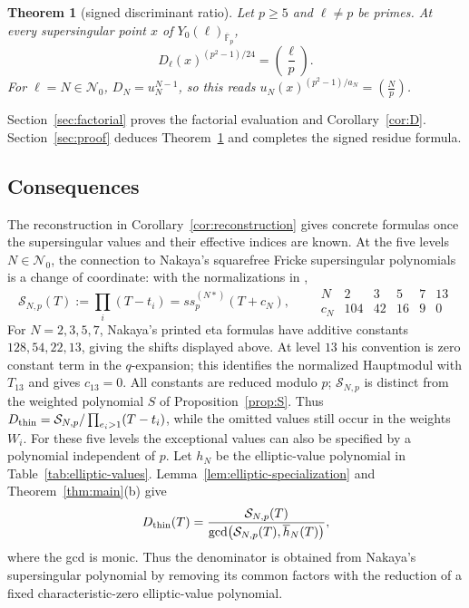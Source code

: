 \documentclass[11pt,a4paper]{article}
\numberwithin{equation}{section}
\newtheorem{theorem}{Theorem}[section]
\theoremstyle{definition}
\theoremstyle{remark}
\newcommand{\Fb}{\overline{\mathbb F}_p}
\newcommand{\leg}[2]{\left(\frac{#1}{#2}\right)}
\newcommand{\Lp}[1]{\left(\frac{#1}{p}\right)}
\begin{document}
\begin{theorem}[signed discriminant ratio]\label{thm:C}
Let $p\ge5$ and $\ell\ne p$ be primes. At every supersingular point
$x$ of $Y_0(\ell)_{\Fb}$,
\[
D_\ell(x)^{(p^2-1)/24}=\leg{\ell}{p}.
\]
For $\ell=N\in\mathcal N_0$, $D_N=u_N^{N-1}$, so this reads
$u_N(x)^{(p^2-1)/a_N}=\Lp{N}$.
\end{theorem}

Section~\ref{sec:factorial} proves the factorial evaluation and
Corollary~\ref{cor:D}. Section~\ref{sec:proof} deduces
Theorem~\ref{thm:C} and completes the signed residue formula.

\subsection{Consequences}\label{subsec:consequences}
The reconstruction in Corollary~\ref{cor:reconstruction} gives concrete formulas
once the supersingular values and their effective indices are known.
At the five levels $N\in\mathcal N_0$, the connection to Nakaya's
squarefree Fricke supersingular polynomials is a change of coordinate:
with the normalizations in \citet[\S4]{Nakaya19},
\begin{equation}\label{eq:nakaya-coordinate}
\mathcal S_{N,p}(T):=\prod_i(T-t_i)=ss_p^{(N*)}(T+c_N),\qquad
\begin{array}{c|rrrrr}
N&2&3&5&7&13\\\hline
c_N&104&42&16&9&0
\end{array}
\end{equation}
For $N=2,3,5,7$, Nakaya's printed eta formulas have additive
constants $128,54,22,13$, giving the shifts displayed above. At level
$13$ his convention is zero constant term in the $q$-expansion; this
identifies the normalized Hauptmodul with $T_{13}$ and gives $c_{13}=0$.
All constants are reduced modulo $p$; $\mathcal S_{N,p}$ is distinct from the
weighted polynomial $S$ of Proposition~\ref{prop:S}. Thus
$D_{\rm thin}=\mathcal S_{N,p}/\prod_{e_i>1}(T-t_i)$, while the omitted
values still occur in the weights $W_i$.
For these five levels the exceptional values can also be specified
by a polynomial independent of $p$.
Let $h_N$ be the elliptic-value polynomial in Table~\ref{tab:elliptic-values}.
Lemma~\ref{lem:elliptic-specialization} and Theorem~\ref{thm:main}(b) give
\begin{equation}\label{eq:elliptic-gcd}
D_{\rm thin}(T)=\frac{\mathcal S_{N,p}(T)}
{\gcd\bigl(\mathcal S_{N,p}(T),\overline h_N(T)\bigr)},
\end{equation}
where the gcd is monic. Thus the denominator is obtained from Nakaya's
supersingular polynomial by removing its common factors with the reduction
of a fixed characteristic-zero elliptic-value polynomial.
\end{document}
